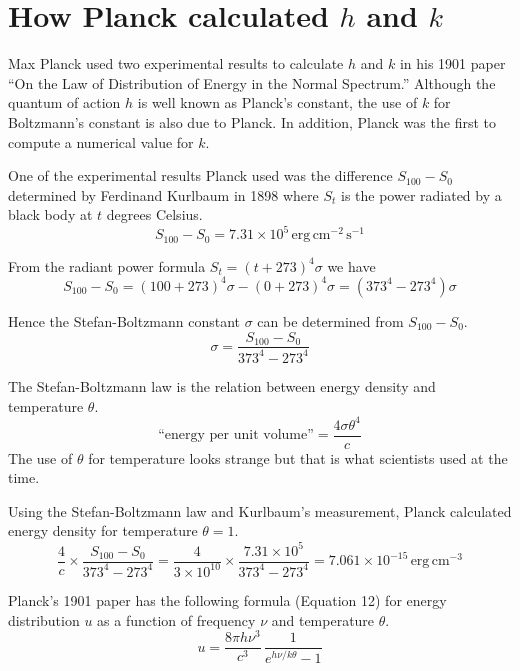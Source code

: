 \documentclass[12pt]{article}
\begin{document}
\section*{How Planck calculated $h$ and $k$}

Max Planck used two experimental results to calculate $h$ and $k$ in his 1901 paper
``On the Law of Distribution of Energy in the Normal Spectrum.''
Although the quantum of action $h$ is well known as Planck's constant,
the use of $k$ for Boltzmann's constant is also due to Planck.
In addition, Planck was the first to compute a numerical value for $k$.

\bigskip
One of the experimental results Planck used was the difference $S_{100}-S_0$
determined by Ferdinand Kurlbaum in 1898 where
$S_t$ is the power radiated by a black body at $t$ degrees Celsius.
\begin{equation*}
S_{100}-S_0=7.31\times10^5\,\text{erg}\,\text{cm}^{-2}\,\text{s}^{-1}
\end{equation*}

From the radiant power formula $S_t=(t+273)^4\sigma$ we have
\begin{equation*}
S_{100}-S_0=(100+273)^4\sigma-(0+273)^4\sigma=(373^4-273^4)\sigma
\end{equation*}

Hence the Stefan-Boltzmann constant $\sigma$ can be determined from $S_{100}-S_0$.
\begin{equation*}
\sigma=\frac{S_{100}-S_0}{373^4-273^4}%
\end{equation*}

The Stefan-Boltzmann law is the relation between energy density and temperature $\theta$.
\begin{equation*}
\text{``energy per unit volume''}=\frac{4\sigma \theta^4}{c}
\end{equation*}
The use of $\theta$ for temperature looks strange but that is what scientists used at the time.

\bigskip
Using the Stefan-Boltzmann law and Kurlbaum's measurement,
Planck calculated energy density for temperature $\theta=1$.
\begin{equation*}
\frac{4}{c}\times
\frac{S_{100}-S_0}{373^4-273^4}
=\frac{4}{3\times10^{10}}\times\frac{7.31\times10^5}{373^4-273^4}
=7.061\times10^{-15}\,\text{erg}\,\text{cm}^{-3}
\end{equation*}

Planck's 1901 paper has the following formula (Equation 12) for energy distribution
$u$ as a function of frequency $\nu$ and temperature $\theta$.
\begin{equation*}
u=\frac{8\pi h\nu^3}{c^3}\,\frac{1}{e^{h\nu/k\theta}-1}
\end{equation*}
\end{document}
